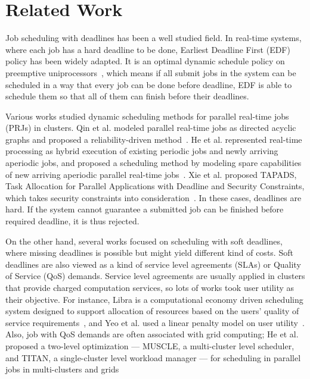 \chapter{Related Work}\label{sec:related}

Job scheduling with deadlines has been a well studied field.
In real-time systems, where each job has a hard deadline to be done,
Earliest Deadline First (EDF) policy has been widely adapted.
It is an optimal dynamic schedule policy on preemptive
uniprocessors~\cite{cite:pinedo2012scheduling}, which means if all
submit jobs in the system can be scheduled in a way that every job can
be done before deadline, EDF is able to schedule them so that all of
them can finish before their deadlines.

Various works studied dynamic scheduling methods for parallel real-time
jobs (PRJs) in clusters.
Qin et al. modeled parallel real-time jobs as directed acyclic graphs
and proposed a reliability-driven
method~\cite{cite:qin-reliability-driven}.
He et al. represented real-time processing as hybrid execution of
existing periodic jobs and newly arriving aperiodic jobs, and proposed a
scheduling method by modeling spare capabilities of new arriving
aperiodic parallel real-time jobs~\cite{cite:he-spare-capabilities}.
Xie et al. proposed TAPADS, Task Allocation for Parallel Applications
with Deadline and Security Constraints, which takes security constraints
into consideration~\cite{cite:xie-TAPADS,cite:xie2008security}.
In these cases, deadlines are hard.
If the system cannot guarantee a submitted job can be finished before
required deadline, it is thus rejected.

On the other hand, several works focused on scheduling with soft
deadlines, where missing deadlines is possible but might yield different
kind of costs.
Soft deadlines are also viewed as a kind of service level agreements
(SLAs) or Quality of Service (QoS) demands.
Service level agreements are usually applied in clusters that provide
charged computation services, so lots of works took user utility as
their objective.
For instance, Libra is a computational economy driven scheduling system
designed to support allocation of resources based on the users' quality
of service requirements~\cite{cite:libra}, and Yeo et al. used a linear
penalty model on user utility~\cite{cite:yeo-SLA-penalty}.
Also, job with QoS demands are often associated with grid computing; He
et al. proposed a two-level optimization --- MUSCLE, a multi-cluster
level scheduler, and TITAN, a single-cluster level workload manager ---
for scheduling in parallel jobs in multi-clusters and
grids~\cite{cite:he-muscle-titan}

